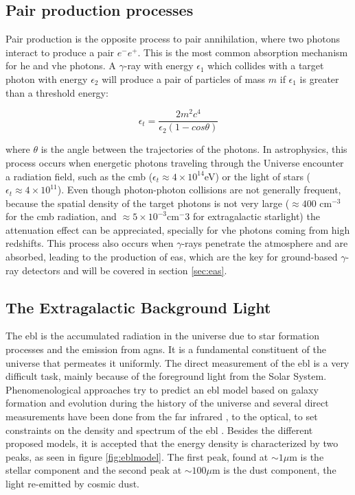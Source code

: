\documentclass[main.tex]{subfiles}
\begin{document}
\subsection{Pair production processes}

Pair production is the opposite process to pair annihilation, where two photons interact to produce a pair $e^{-}e^{+}$. This is the most common absorption mechanism for \gls{he} and \gls{vhe} photons.
A $\gamma$-ray with energy $\epsilon_1$ which collides with a target photon with energy $\epsilon_2$ will produce a pair of particles of mass $m$ if $\epsilon_1$ is greater than a threshold energy:

\begin{equation}
    \epsilon_t = \frac{2m^2c^4}{\epsilon_2(1-cos\theta)}
\end{equation}

where $\theta$ is the angle between the trajectories of the photons. In astrophysics, this process occurs when energetic photons traveling through the Universe encounter a radiation field, such as the \gls{cmb} ($\epsilon_t \approx 4\times10^{14}$eV) or the light of stars ($\epsilon_t \approx 4\times10^{11}$). Even though photon-photon collisions are not generally frequent, because the spatial density of the target photons is not very large ($\approx 400$ cm$^{-3}$ for the \gls{cmb} radiation, and $\approx 5\times10^{-3}$cm$^-3$ for extragalactic starlight) the attenuation effect can be appreciated, specially for \gls{vhe} photons coming from high redshifts. 
This process also occurs when $\gamma$-rays penetrate the atmosphere and are absorbed, leading to the production of \gls{eas}, which are the key for ground-based $\gamma$-ray detectors and will be covered in section \ref{sec:eas}.

\subsection{The Extragalactic Background Light}

The \gls{ebl} is the accumulated radiation in the universe due to star formation processes and the emission from \glspl{agn}. It is a fundamental constituent of the universe that permeates it uniformly. The direct measurement of the \gls{ebl} is a very difficult task, mainly because of the foreground light from the Solar System.  Phenomenological approaches try to predict an \gls{ebl} model based on galaxy formation and evolution during the history of the universe and several direct measurements have been done from the far infrared , to the optical, to set constraints on the density and spectrum of the \gls{ebl} \cite{DominguezEBL}. Besides the different proposed models, it is accepted that the energy density is characterized by two peaks, as seen in figure \ref{fig:eblmodel}. The first peak, found at $\sim 1\mu$m is the stellar component and the second peak at $\sim 100 \mu $m is the dust component, the light re-emitted by cosmic dust. 
\end{document}
